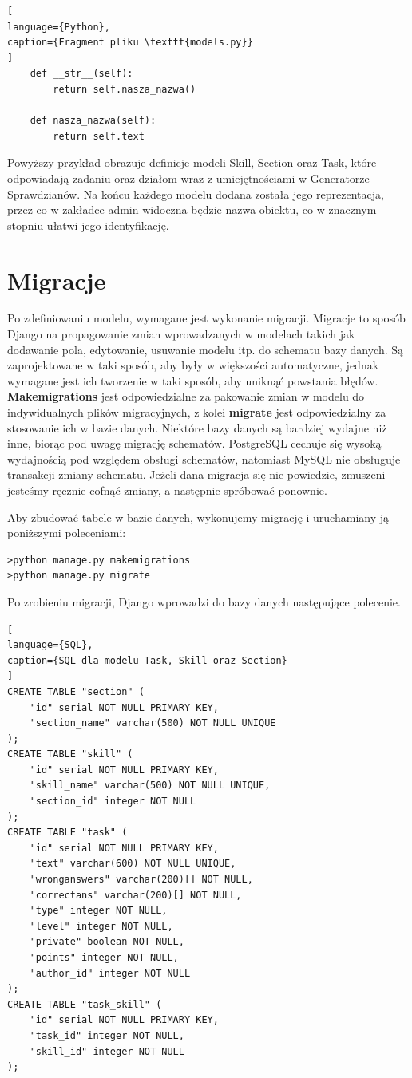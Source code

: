 \documentclass[oneside,polski,logo,indent]{amuthesis}
\begin{document}
\begin{enumerate}
\begin{enumerate}
\begin{lstlisting}[
language={Python},
caption={Fragment pliku \texttt{models.py}}
]
    def __str__(self):
        return self.nasza_nazwa()

    def nasza_nazwa(self):
        return self.text
\end{lstlisting}

Powyższy przykład obrazuje definicje modeli Skill, Section oraz Task, które odpowiadają zadaniu oraz działom wraz z umiejętnościami w Generatorze Sprawdzianów. Na końcu każdego modelu dodana została jego reprezentacja, przez co w zakładce admin widoczna będzie nazwa obiektu, co w znacznym stopniu ułatwi jego identyfikację.  
\section{Migracje}
Po zdefiniowaniu modelu, wymagane jest wykonanie migracji. Migracje to sposób Django na propagowanie zmian wprowadzanych w modelach takich jak dodawanie pola, edytowanie, usuwanie modelu itp. do schematu bazy danych. Są zaprojektowane w taki sposób, aby były w większości automatyczne, jednak wymagane jest ich tworzenie w taki sposób, aby uniknąć powstania błędów. \textbf{Makemigrations} jest odpowiedzialne za pakowanie zmian w modelu do indywidualnych plików migracyjnych, z kolei \textbf{migrate} jest odpowiedzialny za stosowanie ich w bazie danych.
Niektóre bazy danych są bardziej wydajne niż inne, biorąc pod uwagę migrację schematów. PostgreSQL cechuje się wysoką wydajnością pod względem obsługi schematów, natomiast MySQL nie obsługuje transakcji zmiany schematu. Jeżeli dana migracja się nie powiedzie, zmuszeni jesteśmy ręcznie cofnąć zmiany, a następnie spróbować ponownie. 

Aby zbudować tabele w bazie danych, wykonujemy migrację i uruchamiany ją poniższymi poleceniami: 

\begin{lstlisting}[style=DOS]
>python manage.py makemigrations
>python manage.py migrate
\end{lstlisting}
Po zrobieniu migracji, Django wprowadzi do bazy danych następujące polecenie.
\begin{lstlisting}[
language={SQL},
caption={SQL dla modelu Task, Skill oraz Section}
]
CREATE TABLE "section" (
	"id" serial NOT NULL PRIMARY KEY, 
	"section_name" varchar(500) NOT NULL UNIQUE
);
CREATE TABLE "skill" (
	"id" serial NOT NULL PRIMARY KEY, 
	"skill_name" varchar(500) NOT NULL UNIQUE, 
	"section_id" integer NOT NULL
);
CREATE TABLE "task" (
	"id" serial NOT NULL PRIMARY KEY, 
	"text" varchar(600) NOT NULL UNIQUE, 
	"wronganswers" varchar(200)[] NOT NULL, 
	"correctans" varchar(200)[] NOT NULL,
	"type" integer NOT NULL, 
	"level" integer NOT NULL, 
	"private" boolean NOT NULL, 
	"points" integer NOT NULL, 
	"author_id" integer NOT NULL
);
CREATE TABLE "task_skill" (
	"id" serial NOT NULL PRIMARY KEY, 
	"task_id" integer NOT NULL, 
	"skill_id" integer NOT NULL
);


\end{lstlisting}
\end{enumerate}
\end{enumerate}
\end{document}
